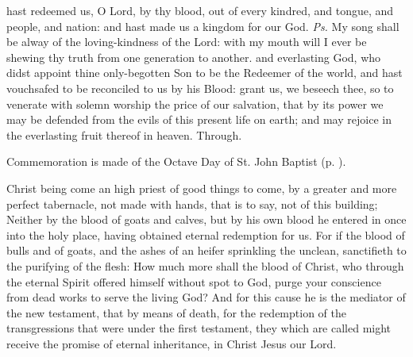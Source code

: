 \introit
{} hast redeemed us, O Lord, by thy blood, out of every kindred, and tongue, and people, and nation: and hast made us a kingdom for our God. \textit{Ps.} My song shall be alway of the loving-kindness of the Lord: with my mouth will I ever be shewing thy truth from one generation to another.
\collect
{} and everlasting God, who didst appoint thine only-begotten Son to be the Redeemer of the world, and hast vouchsafed to be reconciled to us by his Blood: grant us, we beseech thee, so to venerate with solemn worship the price of our salvation, that by its power we may be defended from the evils of this present life on earth; and may rejoice in the everlasting fruit thereof in heaven. Through.
\begin{rubric}
    Commemoration is made of the Octave Day of St. John Baptist (p. \pageref{JohnCollect}).
\end{rubric}
 Christ being come an high priest of good things to come, by a greater and more perfect tabernacle, not made with hands, that is to say, not of this building; Neither by the blood of goats and calves, but by his own blood he entered in once into the holy place, having obtained eternal redemption for us. For if the blood of bulls and of goats, and the ashes of an heifer sprinkling the unclean, sanctifieth to the purifying of the flesh: How much more shall the blood of Christ, who through the eternal Spirit offered himself without spot to God, purge your conscience from dead works to serve the living God? And for this cause he is the mediator of the new testament, that by means of death, for the redemption of the transgressions that were under the first testament, they which are called might receive the promise of eternal inheritance, %
in Christ Jesus our Lord.



